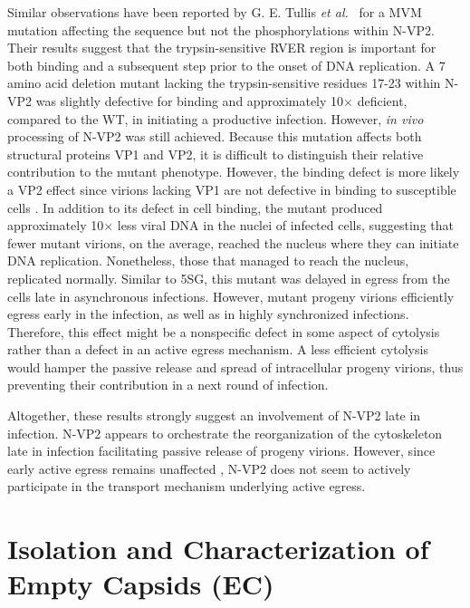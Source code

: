 Similar observations have been reported by G. E. Tullis \textit{et al.}~\cite{pmid1448928} for a MVM mutation affecting the sequence but not the phosphorylations within N-VP2. Their results suggest that the trypsin-sensitive RVER region is important for both binding and a subsequent step prior to the onset of DNA replication. A 7 amino acid deletion mutant lacking the trypsin-sensitive residues 17-23 within N-VP2 was slightly defective for binding and approximately 10$\times$ deficient, compared to the WT, in initiating a productive infection. However, \textit{in vivo} processing of N-VP2 was still achieved. Because this mutation affects both structural proteins VP1 and VP2, it is difficult to distinguish their relative contribution to the mutant phenotype. However, the binding defect is more likely a VP2 effect since virions lacking VP1 are not defective in binding to susceptible cells \cite{pmid8416366}. In addition to its defect in cell binding, the mutant produced approximately 10$\times$ less viral DNA in the nuclei of infected cells, suggesting that fewer mutant virions, on the average, reached the nucleus where they can initiate DNA replication. Nonetheless, those that managed to reach the nucleus, replicated normally. Similar to 5SG, this mutant was delayed in egress from the cells late in asynchronous infections. However, mutant progeny virions efficiently egress early in the infection, as well as in highly synchronized infections. Therefore, this effect might be a nonspecific defect in some aspect of cytolysis rather than a defect in an active egress mechanism. A less efficient cytolysis would hamper the passive release and spread of intracellular progeny virions, thus preventing their contribution in a next round of infection.

Altogether, these results strongly suggest an involvement of N-VP2 late in infection. N-VP2 appears to orchestrate the reorganization of the cytoskeleton late in infection facilitating passive release of progeny virions. However, since early active egress remains unaffected \cite{pmid1448928}, N-VP2 does not seem to actively participate in the transport mechanism underlying active egress.        




\section{Isolation and Characterization of Empty Capsids (EC)}

